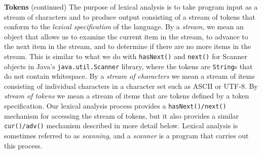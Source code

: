 \begin{minipage}[t]{\sw}
\slidenumber
\LARGE
{\bf Tokens} (continued)\exx
The purpose of lexical analysis is to take program input
as a stream of characters and to produce output consisting
of a stream of tokens that conform
to the {\em lexical specification} of the language.\exx
By a {\em stream}, we mean an object that allows us
to examine the current item in the stream,
to advance to the next item in the stream,
and to determine if there are no more items in the stream.
This is similar to what we do with \verb'hasNext()' and \verb'next()'
for Scanner objects in Java's \verb'java.util.Scanner' library,
where the tokens are \verb'String's that do not contain whitespace.\exx
By a {\em stream of characters}
we mean a stream of items consisting of individual characters
in a character set such as ASCII or UTF-8.
By {\em stream of tokens} we mean
a stream of items that are tokens defined by a token specification.
Our lexical analysis process provides a \verb'hasNext()/next()' mechanism
for accessing the stream of tokens,
but it also provides a similar \verb'cur()/adv()' mechanism
described in more detail below.\exx
Lexical analysis is sometimes referred to as {\em scanning},
and a {\em scanner} is a program that carries out this process.\exx

\end{minipage}
